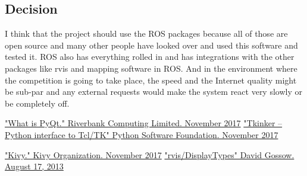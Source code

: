 \documentclass[onecolumn, draftclsnofoot, 10pt, compsoc]{IEEEtran}
\begin{document}
\subsection{Decision}
I think that the project should use the ROS packages because all of those are open source and many other people have looked over and used this software and tested it.
ROS also has everything rolled in and has integrations with the other packages like rvis and mapping software in ROS.
And in the environment where the competition is going to take place, the speed and the Internet quality might be sub-par and any external requests would make the system react very slowly or be completely off.
\begin{thebibliography}{9}
\href{https://riverbankcomputing.com/software/pyqt/intro}{"What is PyQt." Riverbank Computing Limited. November 2017}
\href{https://docs.python.org/2/library/tkinter.html}{"Tkinker -- Python interface to Tcl/TK" Python Software Foundation. November 2017}

\href{https://kivy.org/}{"Kivy." Kivy Organization. November 2017}
\href{http://wiki.ros.org/rviz/DisplayTypes}{"rvis/DisplayTypes" David Gossow. August 17, 2013}

\end{thebibliography}
\end{document}
